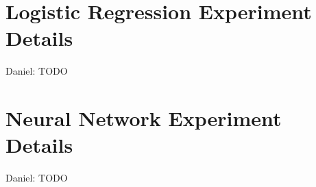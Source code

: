 \documentclass{article}
\begin{document}
\section{Logistic Regression Experiment Details}

{\color{blue}
Daniel: TODO
}

\section{Neural Network Experiment Details}

{\color{blue}
Daniel: TODO
}

\end{document}
